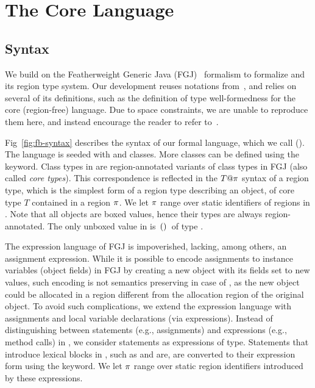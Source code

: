\section{The Core Language}
\label{sec:type-system}



\subsection{Syntax}
\label{sec:fb-syntax}

We build on the Featherweight Generic Java (FGJ)~\cite{fgj} formalism
to formalize \name and its region type system. Our development reuses
notations from~\cite{fgj}, and relies on several of its definitions,
such as the definition of type well-formedness for the core
(region-free) language. Due to space constraints, we are unable to
reproduce them here, and instead encourage the reader to refer
to~\cite{fgj}.

Fig~\ref{fig:fb-syntax} describes the syntax of our formal language,
which we call \fbname (\FB). The language is seeded with \ObjZ and
\RgnZ classes. More classes can be defined using the 
keyword. Class types in \FB are region-annotated variants of class
types in FGJ (also called \emph{core types}). This correspondence is
reflected in the $T@\pi$ syntax of a region type, which is the
simplest form of a region type describing an object, of core type $T$
contained in a region $\pi$. We let $\pi$ range over static
identifiers of regions in \FB. Note that all \FB objects are boxed
values, hence their \FB types are always region-annotated. The only
unboxed value in \FB is $\,{\tt ()}\,$ of type \unitZ.

The expression language of FGJ is impoverished, lacking, among others,
an assignment expression. While it is possible to encode
assignments to instance variables (object fields) in FGJ by creating a
new object with its fields set to new values, such encoding is not
semantics preserving in case of \name, as the new object could be
allocated in a region different from the allocation region of the
original object. To avoid such complications, we extend the expression
language with assignments and local variable declarations (via 
expressions). Instead of distinguishing between statements (e.g.,
assignments) and expressions (e.g., method calls) in \FB, we consider
statements as expressions of \unitZ type.  Statements that introduce
lexical blocks in \name, such as  and  are, are
converted to their expression form using the  keyword. We let
$\pi$ range over static region identifiers introduced by these
expressions.

